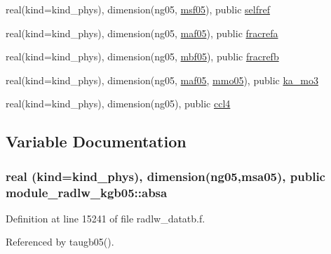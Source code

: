 \begin{DoxyCompactItemize}
\item 
real(kind=kind\+\_\+phys), dimension(ng05, \hyperlink{namespacemodule__radlw__kgb05_a1c9a43b7011e7328fa62d3ecd29acc73}{msf05}), public \hyperlink{namespacemodule__radlw__kgb05_a3c727eabe159c88fca912f33a2b91943}{selfref}
\item 
real(kind=kind\+\_\+phys), dimension(ng05, \hyperlink{namespacemodule__radlw__kgb05_aba904215976d7f4316b52c8f0cffe595}{maf05}), public \hyperlink{namespacemodule__radlw__kgb05_a335fd60e59154f47724d2e25fdf0a5fb}{fracrefa}
\item 
real(kind=kind\+\_\+phys), dimension(ng05, \hyperlink{namespacemodule__radlw__kgb05_a57db9a9cb9acac604df555038f6127a3}{mbf05}), public \hyperlink{namespacemodule__radlw__kgb05_af7b1fd9c6b966e03a226dd8cbc058670}{fracrefb}
\item 
real(kind=kind\+\_\+phys), dimension(ng05, \hyperlink{namespacemodule__radlw__kgb05_aba904215976d7f4316b52c8f0cffe595}{maf05}, \hyperlink{namespacemodule__radlw__kgb05_aa552aae4878030144218ca6c2bbe417f}{mmo05}), public \hyperlink{namespacemodule__radlw__kgb05_a6021fc2f60379615b7882a28e1caa1e9}{ka\+\_\+mo3}
\item 
real(kind=kind\+\_\+phys), dimension(ng05), public \hyperlink{namespacemodule__radlw__kgb05_a15c6b3bfa9d8cbf20099dd4f364444b5}{ccl4}
\end{DoxyCompactItemize}


\subsection{Variable Documentation}
\subsubsection[{\texorpdfstring{absa}{absa}}]{\setlength{\rightskip}{0pt plus 5cm}real (kind=kind\+\_\+phys), dimension(ng05,{\bf msa05}), public module\+\_\+radlw\+\_\+kgb05\+::absa}\hypertarget{namespacemodule__radlw__kgb05_a30ce809b40dd99b3219996ac8f023274}{}\label{namespacemodule__radlw__kgb05_a30ce809b40dd99b3219996ac8f023274}


Definition at line 15241 of file radlw\+\_\+datatb.\+f.



Referenced by taugb05().


